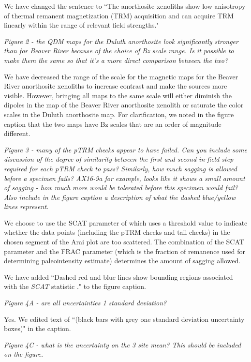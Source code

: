\documentclass[11pt, letterpaper]{article}
\begin{document}
\begin{flushleft}
We have changed the sentence to ``The anorthosite xenoliths show low anisotropy of thermal remanent magnetization (TRM) acquisition and can acquire TRM linearly within the range of relevant field strengths."

\textit{Figure 2 - the QDM maps for the Duluth anorthosite look significantly stronger than for Beaver River because of the choice of Bz scale range. Is it possible to make them the same so that it's a more direct comparison between the two?}

We have decreased the range of the scale for the magnetic maps for the Beaver River anorthosite xenoliths to increase contrast and make the sources more visible. However, bringing all maps to the same scale will either diminish the dipoles in the map of the Beaver River anorthosite xenolith or saturate the color scales in the Duluth anorthosite map. For clarification, we noted in the figure caption that the two maps have Bz scales that are an order of magnitude different.

\textit{Figure 3 - many of the pTRM checks appear to have failed. Can you include some discussion of the degree of similarity between the first and second in-field step required for each pTRM check to pass? Similarly, how much sagging is allowed before a specimen fails? AX16-9a for example, looks like it shows a small amount of sagging - how much more would be tolerated before this specimen would fail? Also include in the figure caption a description of what the dashed blue/yellow lines represent.}

We choose to use the SCAT parameter of \cite{Tauxe2004a} which uses a threshold value to indicate whether the data points (including the pTRM checks and tail checks) in the chosen segment of the Arai plot are too scattered. The combination of the SCAT parameter and the FRAC parameter (which is the fraction of remanence used for determining paleointensity estimate) determines the amount of sagging allowed.

We have added ``Dashed red and blue lines show bounding regions associated with the \textit{SCAT} statistic \citep{Shaar2013a}." to the figure caption.

\textit{Figure 4A - are all uncertainties 1 standard deviation?}

Yes. We edited text of ``(black bars with grey one standard deviation uncertainty boxes)" in the caption.

\textit{Figure 4C - what is the uncertainty on the 3 site mean? This should be included on the figure.}


\end{flushleft}
\end{document}
